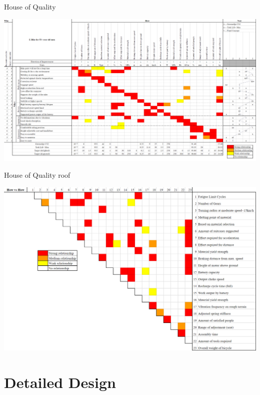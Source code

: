 \documentclass[a4paper,11pt]{article}
\begin{document}
\newpage

\thispagestyle{empty}
\begin{landscape}

\vspace*{\fill} 
\begin{table}[!ht]
	\centering
	\caption{House of Quality}
	\includegraphics[width=1.44\textwidth]{Hous}
	\label{tab:hoq}
\end{table}
\vspace*{\fill} 

\newpage
\thispagestyle{empty}

\begin{table}[!ht]
	\centering
	\caption{House of Quality roof}
	\includegraphics[width=1.44\textwidth]{Roof}
	\label{tab:roof}
\end{table}

\end{landscape}
\restoregeometry

\section{Detailed Design}
\end{document}
